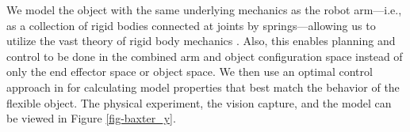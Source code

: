 \documentclass[runningheads,a4paper]{llncs}
\begin{document}




We model the object with the same underlying mechanics as the robot arm---i.e., as a collection of rigid bodies connected at joints by springs---allowing us to utilize the vast theory of rigid body mechanics \cite{murray_li_sastry}. Also, this enables planning and control to be done in the combined arm and object configuration space instead of only the end effector space or object space.  We then use an optimal control approach in \cite{caldwell_coleman_correll_iros} for calculating model properties that best match the behavior of the flexible object. The physical experiment, the vision capture, and the model can be viewed in Figure \ref{fig-baxter_y}.
\end{document}
